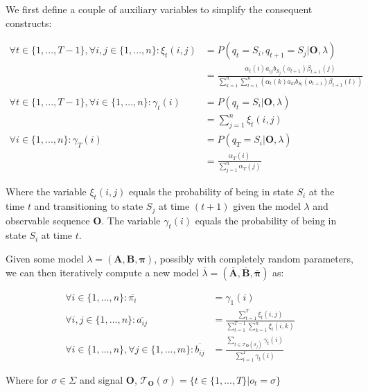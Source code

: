 We first define a couple of auxiliary variables to simplify the consequent constructs:

\begin{align*}
\forall t\in\{1,...,T-1\},\forall i,j\in \{1,...,n\}: \xi_t(i,j) &= P(q_t =S_i, q_{t+1}=S_j|\mathbf{O},\lambda)\\
&= \frac{\alpha_t(i)a_{ij}b_{S_j}(o_{t+1})\beta_{t+1}(j)}{\sum_{k=1}^n\sum_{l=1}^n(\alpha_t(k)a_{kl}b_{S_l}(o_{t+1})\beta_{t+1}(l))}\\
\\
\forall t\in\{1,...,T-1\},\forall i\in\{1,...,n\}: \gamma_t(i) &=P(q_t=S_i|\mathbf{O},\lambda)\\
&=\sum_{j=1}^n\xi_t(i,j)\\
\forall i\in\{1,...,n\}: \gamma_T(i) &= P(q_T=S_i|\mathbf{O},\lambda)\\
&= \frac{\alpha_T(i)}{\sum_{j=1}^n\alpha_T(j)}
\end{align*}

Where the variable $\xi_t(i,j)$ equals the probability of being in state $S_i$ at the time $t$ and transitioning to state $S_j$ at time $(t+1)$ given the model $\lambda$ and observable sequence $\mathbf{O}$. The variable $\gamma_t(i)$ equals the probability of being in state $S_i$ at time $t$.

Given some model $\lambda = (\mathbf{A},\mathbf{B},\boldsymbol{\pi})$, possibly with completely random parameters, we can then iteratively compute a new model $\overline{\lambda} = (\mathbf{\overline{A}},\mathbf{\overline{B}},\boldsymbol{\overline{\pi}})$ as:

\begin{align*}
\forall i\in\{1,...,n\}: \overline{\pi_i} &= \gamma_1(i)\\
\forall i,j\in\{1,...,n\}: \overline{a_{ij}} &= \frac{\sum_{t=1}^T\xi_t(i,j)}{\sum_{t=1}^{T-1}\sum_{k=1}^n\xi_t(i,k)}\\
\forall i\in\{1,...,n\},\forall j\in\{1,...,m\}:\overline{b_{ij}}&=\frac{\sum_{t\in\mathcal{T}_\mathbf{O}(\sigma_j)}\gamma_t(i)}{\sum_{t=1}^T\gamma_t(i)}
\end{align*}

Where for $\sigma \in \Sigma$ and signal $\mathbf{O}$, $\mathcal{T}_\mathbf{O}(\sigma) = \{t\in\{1,...,T\}|o_t=\sigma\}$


